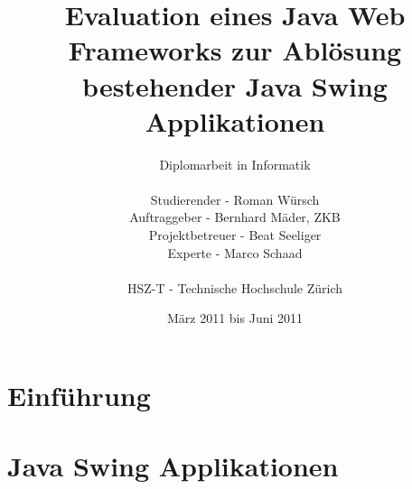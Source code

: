 \documentclass[
11pt, %
a4paper, %
BCOR25mm, %
DIV14, %
footsepline = false, %
headsepline, %
twoside, %
openright,
abstracton, %
listof=totocnumbered, %
bibliography=totocnumbered %
]{scrreprt}
\title{Evaluation eines Java Web Frameworks zur Ablösung bestehender Java Swing
Applikationen}
\author{Diplomarbeit in Informatik\\
    \\
    Studierender - Roman Würsch\\
	Auftraggeber - Bernhard Mäder, ZKB\\
    Projektbetreuer - Beat Seeliger\\
    Experte - Marco Schaad\\
	\\
	HSZ-T - Technische Hochschule Zürich}
\date{März 2011 bis Juni 2011}
\begin{document}
  \ifpdf
  \else
  \fi
  
  
  \maketitle
  
  \cleardoublepage
  
  
  
  
  
  \cleardoublepage
  

  
  \tableofcontents
  
  \cleardoublepage
    
      
  
  \chapter{Einführung}\label{chapter:Einfuehrung}
  
    

  \cleardoublepage
   
  
  \chapter{Java Swing Applikationen}\label{chapter:JavaSwingApplikationen}
\end{document}
